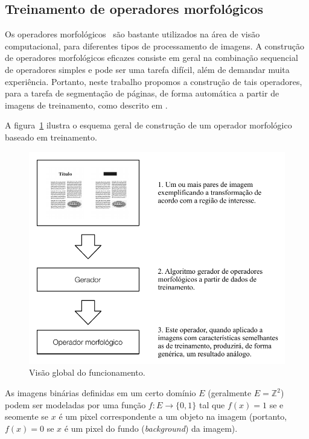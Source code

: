 \documentclass[times, 10pt,twocolumn]{article}
\begin{document}
\subsection{Treinamento de operadores morfológicos}

Os operadores morfológicos~\cite{Serra:1983:IAM:1098652} são bastante
utilizados na área de visão computacional, para diferentes tipos de
processamento de imagens. A construção de operadores morfológicos
eficazes consiste em geral na combinação sequencial de operadores
simples e pode ser uma tarefa difícil, além de demandar muita
experiência. Portanto, neste trabalho propomos a construção de tais
operadores, para a tarefa de segmentação de páginas, de forma
automática a partir de imagens de treinamento, como descrito em
\cite{Tomita:1996:PrAuMa}.

A figura~\ref{fig:schema_overview} ilustra o esquema geral de
construção de um operador morfológico baseado em treinamento.
\begin{figure}[htb!]
\begin{center}
\includegraphics{assets/methodology.pdf}
\end{center}
\caption{Visão global do funcionamento.}
\label{fig:schema_overview}
\end{figure}

As imagens binárias definidas em um certo domínio $E$ (geralmente
$E=\mathbb{Z}^2$) podem ser modeladas por uma função $f: E \to
\{0,1\}$ tal que $f(x)=1$ se e seomente se $x$ é um pixel
correspondente a um objeto na imagem (portanto, $f(x)=0$ se $x$
é um pixel do fundo (\emph{background}) da imagem).
\end{document}
